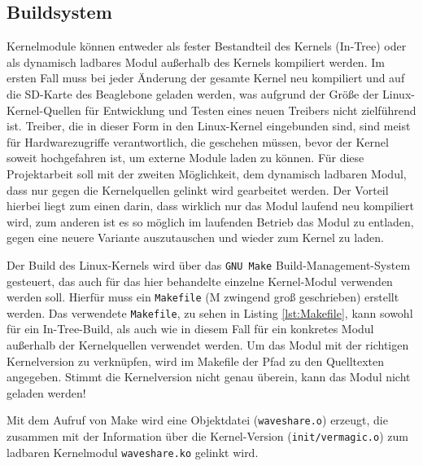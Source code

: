 \subsection{Buildsystem}
Kernelmodule können entweder als fester Bestandteil des Kernels (In-Tree) oder als dynamisch ladbares Modul außerhalb des Kernels kompiliert werden. Im ersten Fall muss bei jeder Änderung der gesamte Kernel neu kompiliert und auf die SD-Karte des Beaglebone geladen werden, was aufgrund der Größe der Linux-Kernel-Quellen für Entwicklung und Testen eines neuen Treibers nicht zielführend ist. Treiber, die in dieser Form in den Linux-Kernel eingebunden sind, sind meist für Hardwarezugriffe verantwortlich, die geschehen müssen, bevor der Kernel soweit hochgefahren ist, um externe Module laden zu können. %
Für diese Projektarbeit soll mit der zweiten Möglichkeit, dem dynamisch ladbaren Modul, dass nur gegen die Kernelquellen gelinkt wird gearbeitet werden. Der Vorteil hierbei liegt zum einen darin, dass wirklich nur das Modul laufend neu kompiliert wird, zum anderen ist es so möglich im laufenden Betrieb das Modul zu entladen, gegen eine neuere Variante auszutauschen und wieder zum Kernel zu laden. 

Der Build des Linux-Kernels wird über das \texttt{GNU Make} Build-Management-System gesteuert, das auch für das hier behandelte einzelne Kernel-Modul verwenden werden soll. Hierfür muss ein \texttt{Makefile} (M zwingend groß geschrieben) erstellt werden. Das verwendete \texttt{Makefile}, zu sehen in Listing \ref{lst:Makefile}, kann sowohl für ein In-Tree-Build, als auch wie in diesem Fall für ein konkretes Modul außerhalb der Kernelquellen verwendet werden. Um das Modul mit der richtigen Kernelversion zu verknüpfen, wird im Makefile der Pfad zu den Quelltexten angegeben. Stimmt die Kernelversion nicht genau überein, kann das Modul nicht geladen werden! 

Mit dem Aufruf von Make wird eine Objektdatei (\texttt{waveshare.o}) erzeugt, die zusammen mit der Information über die Kernel-Version (\texttt{init/vermagic.o}) zum ladbaren Kernelmodul \texttt{waveshare.ko} gelinkt wird. %

